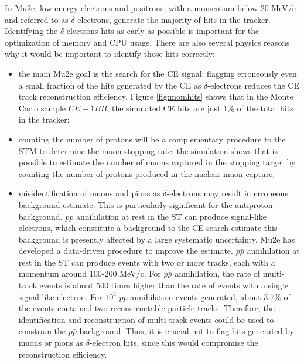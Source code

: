In Mu2e, low-energy electrons 
and positrons, with a momentum below 20 MeV/c and 
referred to as $\delta$-electrons, 
generate the majority of hits in the tracker. 
Identifying the $\delta$-electrons hits as early 
as possible is important for 
the optimization of memory and  CPU usage. There are also several physics 
reasons why it would be important to identify 
those hits correctly:
\begin{itemize}
    \item the main Mu2e goal is the search for the 
    CE signal: flagging erroneously even a small 
    fraction of the hits generated by the 
    CE as $\delta$-electrons reduces the CE track reconstruction efficiency. 
    Figure \ref{fig:momhits} shows that in the 
    Monte Carlo sample $CE-1BB$, the simulated CE 
    hits are just 1\% of the total hits in the tracker;
    \item counting the number of protons 
    will be a complementary procedure to the 
    STM to determine the muon stopping rate: 
    the simulation shows that is possible to 
    estimate the number of muons captured in 
    the stopping target by counting the number 
    of protons produced in the nuclear muon 
    capture;
    \item misidentification of muons 
      and pions as $\delta$-electrons 
    may result in erroneous background estimate. 
    This is particularly significant for the 
    antiproton background.
    $p\bar{p}$ annihilation at rest in the ST 
    can produce signal-like electrons, which 
    constitute a background to the CE search estimate  this background is 
    presently affected by a large systematic 
    uncertainty. Mu2e has developed a data-driven 
    procedure to improve the estimate.
    $p\bar{p}$ annihilation at rest in the ST 
    can produce events with two or more tracks, 
    each with a momentum around 100-200 MeV/c. 
    For $p\bar{p}$ annihilation, 
    the rate of multi-track events 
    is about 500 times higher 
    than the rate of events with a single 
    signal-like electron. 
    For $10^4$ $p\bar{p}$ annihilation events 
    generated, about 3.7\% of 
    the events contained two reconstructable 
    particle tracks. Therefore, 
    the identification and reconstruction of 
    multi-track events could be 
    used to constrain the $p\bar{p}$ background. 
    Thus, it is crucial not to flag hits 
    generated by muons or pions as $\delta$-electron 
    hits, since this would compromise the 
    reconstruction efficiency. 
\end{itemize}
